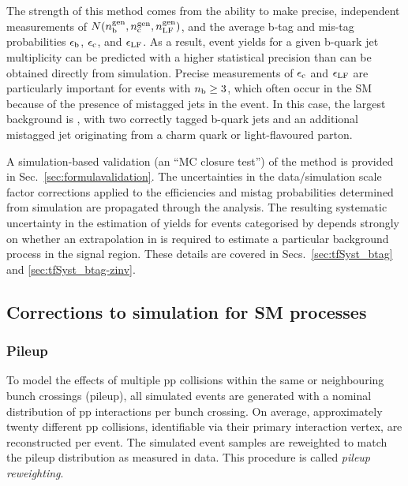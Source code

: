 The strength of this method comes from the 
ability to make precise, \nb independent measurements 
of $N(n_{\rm b}^{\rm gen},n_{\rm c}^{\rm gen},n_{\rm LF}^{\rm gen})$,
and the average b-tag and mis-tag probabilities
$\epsilon_{\rm b}$, $\epsilon_{\rm c}$, and $\epsilon_{\rm LF}$.
As a result, event yields for a given b-quark jet multiplicity can
be predicted with a higher statistical precision than can be obtained
directly from simulation.
Precise measurements of $\epsilon_{\rm c}$ and
$\epsilon_{\rm LF}$ are particularly important for events with $n_{\rm b} \geq
3$, which often occur in the SM because of the presence of mistagged
jets in the event. In this case, the largest background is \ttbar,
with two correctly tagged b-quark jets and an additional mistagged jet
originating from a charm quark or light-flavoured parton.

A simulation-based validation (\ie an ``MC closure test'') of the
method is provided in Sec.~\ref{sec:formulavalidation}. The
uncertainties in the data/simulation scale factor corrections applied
to the efficiencies and mistag probabilities determined from
simulation are propagated through the analysis. The resulting
systematic uncertainty in the estimation of yields for events
categorised by \nb depends strongly on whether an extrapolation in \nb
is required to estimate a particular background process in the signal
region. These details are covered in Secs.~\ref{sec:tfSyst_btag} and
\ref{sec:tfSyst_btag-zinv}.

\subsection{Corrections to simulation for SM processes}
\label{sec:sim-corrs}

\subsubsection{Pileup}
\label{sec:pileup-reweighting}

To model the effects of multiple pp collisions within the same or
neighbouring bunch crossings (pileup), all simulated events are
generated with a nominal distribution of pp interactions per bunch
crossing. On average, approximately twenty different pp collisions,
identifiable via their primary interaction vertex, are reconstructed
per event. The simulated event samples are reweighted to match the
pileup distribution as measured in data. This procedure is called
\textit{pileup reweighting}.

